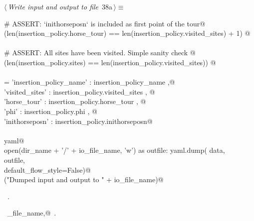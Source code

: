 \documentclass[11.5pt]{report}
\begin{document}
\begin{flushleft} \small\label{scrap39}\raggedright\small
{} $\langle\,${\itshape Write input and output to file}\nobreak\ {\footnotesize {38a}}$\,\rangle\equiv$
\vspace{-1ex}
\begin{list}{}{} \item
\mbox{}\verb@# ASSERT: `inithorseposn` is included as first point of the tour@\\
\mbox{}\verb@assert(len(insertion_policy.horse_tour) == len(insertion_policy.visited_sites) + 1) @\\
\mbox{}\verb@@\\
\mbox{}\verb@# ASSERT: All sites have been visited. Simple sanity check @\\
\mbox{}\verb@assert(len(insertion_policy.sites)   == len(insertion_policy.visited_sites)) @\\
\mbox{}\verb@@\\
\mbox{}\verb@data = {'insertion_policy_name' : insertion_policy_name   ,@\\
\mbox{}\verb@        'visited_sites'  : insertion_policy.visited_sites , @\\
\mbox{}\verb@        'horse_tour'     : insertion_policy.horse_tour    , @\\
\mbox{}\verb@        'phi'            : insertion_policy.phi           , @\\
\mbox{}\verb@        'inithorseposn'  : insertion_policy.inithorseposn}@\\
\mbox{}\verb@@\\
\mbox{}\verb@import yaml@\\
\mbox{}\verb@with open(dir_name + '/' + io_file_name, 'w') as outfile:     yaml.dump( data, \@\\
\mbox{}\verb@                outfile, \@\\
\mbox{}\verb@                default_flow_style=False)@\\
\mbox{}\verb@debug("Dumped input and output to " + io_file_name)@\\
\mbox{}\verb@@{\NWsep}
\end{list}
\vspace{-1.5ex}
\footnotesize
\begin{list}{}{\setlength{\itemsep}{-\parsep}\setlength{\itemindent}{-\leftmargin}}
\item \NWtxtMacroRefIn\ .
\item \NWtxtIdentsUsed\nobreak\  \verb@io_file_name,@\nobreak\ .
\item{}
\end{list}
\vspace{4ex}
\end{flushleft}
\end{document}

